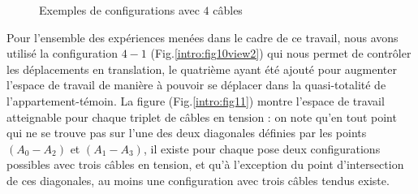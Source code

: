 \begin{figure}[htp]
  \centering
   \hfill
   \hfill
    \caption{\footnotesize{Exemples de configurations avec $4$ câbles}}
\label{intro:fig9}
\end{figure}

Pour l'ensemble des expériences menées dans le cadre de ce travail, nous avons 
utilisé la configuration $4-1$ (Fig.\ref{intro:fig10view2}) qui nous permet de 
contrôler les déplacements en translation, le quatrième ayant été ajouté pour 
augmenter l'espace de travail de manière à pouvoir se déplacer dans la 
quasi-totalité de l'appartement-témoin. La figure (Fig.\ref{intro:fig11}) montre 
l'espace de travail atteignable pour chaque triplet de câbles en tension : on 
note qu'en tout point qui ne se trouve pas sur l'une des deux diagonales 
définies par les points $(A_0-A_2)$ et $(A_1-A_3)$, il existe pour chaque pose 
deux configurations possibles avec trois câbles en tension, et qu'à l'exception 
du point d'intersection de ces diagonales, au moins une configuration avec trois 
câbles tendus existe.

